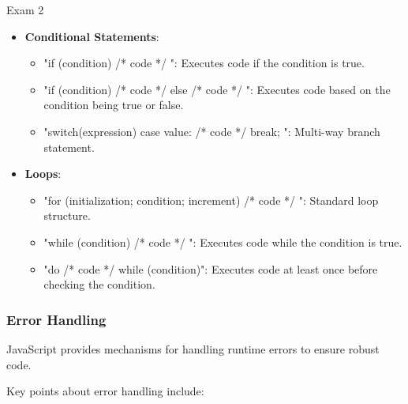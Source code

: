 \begin{examnotes}{Exam 2}
\begin{highlight}
        \begin{itemize}
            \item \textbf{Conditional Statements}:
                \begin{itemize}
                    \item "if (condition) { /* code */ }": Executes code if the condition is true.
                    \item "if (condition) { /* code */ } else { /* code */ }": Executes code based on the condition being true or false.
                    \item "switch(expression) { case value: /* code */ break; }": Multi-way branch statement.
                \end{itemize}
            \item \textbf{Loops}:
                \begin{itemize}
                    \item "for (initialization; condition; increment) { /* code */ }": Standard loop structure.
                    \item "while (condition) { /* code */ }": Executes code while the condition is true.
                    \item "do { /* code */ } while (condition)": Executes code at least once before checking the condition.
                \end{itemize}
        \end{itemize}
    \end{highlight}
    
    \subsubsection*{Error Handling}
    
    JavaScript provides mechanisms for handling runtime errors to ensure robust code.
    
    \begin{highlight}
        Key points about error handling include:
        

\end{highlight}
\end{examnotes}
